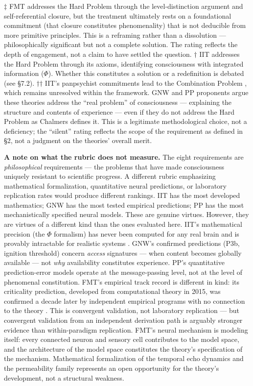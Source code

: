 \documentclass[12pt]{article}
\newcommand{\revstart}{}
\newcommand{\revend}{}
\begin{document}
{\revstart $\ddagger$ FMT addresses the Hard Problem through the level-distinction argument and self-referential closure, but the treatment ultimately rests on a foundational commitment (that closure constitutes phenomenality) that is not deducible from more primitive principles. This is a reframing rather than a dissolution --- philosophically significant but not a complete solution. The rating reflects the depth of engagement, not a claim to have settled the question.\revend}
$\dagger$ IIT addresses the Hard Problem through its axioms, identifying consciousness with integrated information ($\Phi$). Whether this constitutes a solution or a redefinition is debated (see \S7.2).
$\dagger$$\dagger$ IIT's panpsychist commitments lead to the Combination Problem \citep{Chalmers2016}, which remains unresolved within the framework.
\* GNW and PP proponents argue these theories address the ``real problem'' of consciousness \citep{Seth2021} --- explaining the structure and contents of experience --- even if they do not address the Hard Problem as Chalmers defines it. This is a legitimate methodological choice, not a deficiency; the ``silent'' rating reflects the scope of the requirement as defined in \S2, not a judgment on the theories' overall merit.

{\revstart \textbf{A note on what the rubric does not measure.} The eight requirements are \emph{philosophical} requirements --- the problems that have made consciousness uniquely resistant to scientific progress. A different rubric emphasizing mathematical formalization, quantitative neural predictions, or laboratory replication rates would produce different rankings. IIT has the most developed mathematics; GNW has the most tested empirical predictions; PP has the most mechanistically specified neural models. These are genuine virtues. However, they are virtues of a different kind than the ones evaluated here. IIT's mathematical precision (the $\Phi$ formalism) has never been computed for any real brain and is provably intractable for realistic systems \citep{Aaronson2014}. GNW's confirmed predictions (P3b, ignition threshold) concern \emph{access} signatures --- when content becomes globally available --- not \emph{why} availability constitutes experience. PP's quantitative prediction-error models operate at the message-passing level, not at the level of phenomenal constitution. FMT's empirical track record is different in kind: its criticality prediction, developed from computational theory in 2015, was confirmed a decade later by independent empirical programs with no connection to the theory \citep{HengenShew2025,AlgomShriki2026,Toker2026}. This is convergent validation, not laboratory replication --- but convergent validation from an independent derivation path is arguably stronger evidence than within-paradigm replication. FMT's neural mechanism is modeling itself: every connected neuron and sensory cell contributes to the model space, and the architecture of the model space constitutes the theory's specification of the mechanism. Mathematical formalization of the temporal echo dynamics and the permeability family represents an open opportunity for the theory's development, not a structural weakness.\revend}
\end{document}
